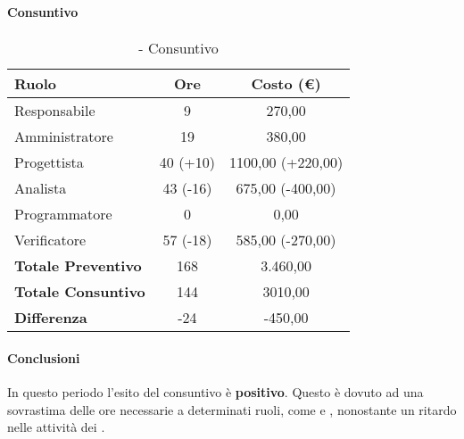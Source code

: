 \documentclass[./PianoDiProgetto.tex]{subfiles}
\begin{document}
	\clearpage
\subsubsection{\PerPD}
\paragraph{Consuntivo}
		\begin{table}[h]
		\centering
		\begin{tabular}{l * {2}{c}}
			\toprule
			\textbf{Ruolo} & \textbf{Ore} & \textbf{Costo (\euro{})} \\
			\midrule
			Responsabile &	9 & 270,00 \\
			Amministratore & 19 & 380,00\\
			Progettista & 40 (+10) & 1100,00 (+220,00) \\
			Analista & 43 (-16) & 675,00 (-400,00) \\
			Programmatore & 0 & 0,00 \\
			Verificatore & 57 (-18) & 585,00 (-270,00) \\
			\midrule
			\textbf{Totale Preventivo} & 168
 & 3.460,00
 \\		
			\textbf{Totale Consuntivo} & 144 & 3010,00
 \\
			\midrule
			\textbf{Differenza} & -24 & -450,00 \\
			\bottomrule
		\end{tabular}
		\caption{\PerPD{} - Consuntivo}
		
	\end{table}	
	\paragraph{Conclusioni}
	In questo periodo l'esito del consuntivo è \textbf{positivo}. Questo è dovuto ad una sovrastima delle ore necessarie a determinati ruoli, come \AN{} e \VER{}, nonostante un ritardo nelle attività dei \PJP{}.
	
	\clearpage
\end{document}
